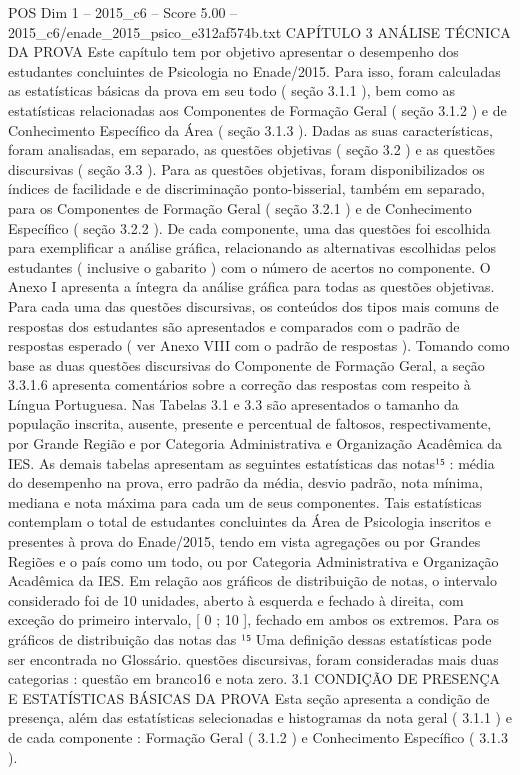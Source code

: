 \begin{textsample}{POS Dim 1 – 2015\_c6 – Score 5.00 – 2015\_c6/enade\_2015\_psico\_e312af574b.txt}  \label{ex:f1_pos_151}
CAPÍTULO 3 ANÁLISE TÉCNICA DA PROVA Este capítulo tem por objetivo apresentar o desempenho dos estudantes concluintes de Psicologia no Enade/2015.
Para isso, foram calculadas as estatísticas básicas da prova em seu todo ( seção 3.1.1 ), bem como as estatísticas relacionadas aos Componentes de Formação Geral ( seção 3.1.2 ) e de Conhecimento Específico da Área ( seção 3.1.3 ).
Dadas as suas características, foram analisadas, em separado, as questões objetivas ( seção 3.2 ) e as questões discursivas ( seção 3.3 ).
Para as questões objetivas, foram disponibilizados os índices de facilidade e de discriminação ponto-bisserial, também em separado, para os Componentes de Formação Geral ( seção 3.2.1 ) e de Conhecimento Específico ( seção 3.2.2 ).
De cada componente, uma das questões foi escolhida para exemplificar a análise gráfica, relacionando as alternativas escolhidas pelos estudantes ( inclusive o gabarito ) com o número de acertos no componente.
O Anexo I apresenta a íntegra da análise gráfica para todas as questões objetivas.
Para cada uma das questões discursivas, os conteúdos dos tipos mais comuns de respostas dos estudantes são apresentados e comparados com o padrão de respostas esperado ( ver Anexo VIII com o padrão de respostas ).
Tomando como base as duas questões discursivas do Componente de Formação Geral, a seção 3.3.1.6 apresenta comentários sobre a correção das respostas com respeito à Língua Portuguesa.
Nas Tabelas 3.1 e 3.3 são apresentados o tamanho da população inscrita, ausente, presente e percentual de faltosos, respectivamente, por Grande Região e por Categoria Administrativa e Organização Acadêmica da IES.
As demais tabelas apresentam as seguintes estatísticas das notas¹⁵ : média do desempenho na prova, erro padrão da média, desvio padrão, nota mínima, mediana e nota máxima para cada um de seus componentes.
Tais estatísticas contemplam o total de estudantes concluintes da Área de Psicologia inscritos e presentes à prova do Enade/2015, tendo em vista agregações ou por Grandes Regiões e o país como um todo, ou por Categoria Administrativa e Organização Acadêmica da IES.
Em relação aos gráficos de distribuição de notas, o intervalo considerado foi de 10 unidades, aberto à esquerda e fechado à direita, com exceção do primeiro intervalo, [ 0 ; 10 ], fechado em ambos os extremos.
Para os gráficos de distribuição das notas das ¹⁵ Uma definição dessas estatísticas pode ser encontrada no Glossário. questões discursivas, foram consideradas mais duas categorias : questão em branco16 e nota zero. 3.1 CONDIÇÃO DE PRESENÇA E ESTATÍSTICAS BÁSICAS DA PROVA Esta seção apresenta a condição de presença, além das estatísticas selecionadas e histogramas da nota geral ( 3.1.1 ) e de cada componente : Formação Geral ( 3.1.2 ) e Conhecimento Específico ( 3.1.3 ).

\end{textsample}
